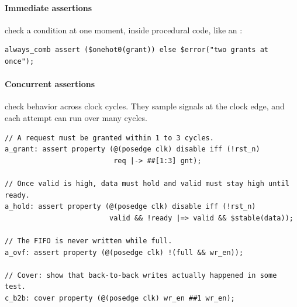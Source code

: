\paragraph{Immediate assertions} check a condition at one moment, inside procedural code, like an :
\begin{lstlisting}
always_comb assert ($onehot0(grant)) else $error("two grants at once");
\end{lstlisting}

\paragraph{Concurrent assertions} check behavior across clock cycles. They sample signals at the clock edge, and each attempt can run over many cycles.

\begin{lstlisting}
// A request must be granted within 1 to 3 cycles.
a_grant: assert property (@(posedge clk) disable iff (!rst_n)
                          req |-> ##[1:3] gnt);

// Once valid is high, data must hold and valid must stay high until ready.
a_hold: assert property (@(posedge clk) disable iff (!rst_n)
                         valid && !ready |=> valid && $stable(data));

// The FIFO is never written while full.
a_ovf: assert property (@(posedge clk) !(full && wr_en));

// Cover: show that back-to-back writes actually happened in some test.
c_b2b: cover property (@(posedge clk) wr_en ##1 wr_en);
\end{lstlisting}


